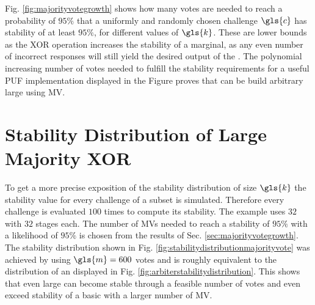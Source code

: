 Fig. \ref{fig:majorityvotegrowth} shows how many votes are needed to reach a probability of $95 \%$ that a uniformly and randomly chosen challenge $\gls{c}$ has stability of at least $95 \%$, for different values of $\gls{k}$.
These are lower bounds as the \ac{XOR} operation increases the stability of a \xpuf marginal, as any even number of incorrect \apuf responses will still yield the desired output of the \xpuf. 
The polynomial increasing number of votes needed to fulfill the stability requirements for a useful PUF implementation displayed in the Figure proves that \xpufs can be build arbitrary large using \ac{MV}.


\section{Stability Distribution of Large Majority \acs{XOR} \apufs}

To get a more precise exposition of the stability distribution of \mxpufs size $\gls{k}$ the stability value for every challenge of a subset is simulated.
Therefore every challenge is evaluated $100$ times to compute its stability.
The example uses $32$ \mpufs with $32$ stages each.
The number of \acp{MV} needed to reach a stability of $95 \%$ with a likelihood of $95 \%$ is chosen from the results of Sec. \ref{sec:majorityvotegrowth}.
The stability distribution shown in Fig. \ref{fig:stabilitydistributionmajorityvote} was achieved by using $\gls{m} = 600$ votes
and is roughly equivalent to the distribution of an \apuf displayed in Fig. \ref{fig:arbiterstabilitydistribution}.
This shows that even large \mxpufs can become stable through a feasible number of votes and even exceed stability of a basic \apuf with a larger number of \ac{MV}.

